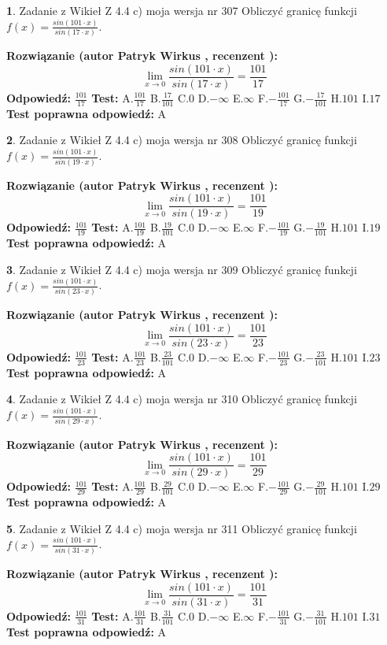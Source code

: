 \documentclass[12pt, a4paper]{article}
\theoremstyle{definition} %
\newtheorem{zad}{}
\newcommand{\zadStart}[1]{\begin{zad}#1\newline}
\newcommand{\zadStop}{\end{zad}}
\newcommand{\rozwStart}[2]{\noindent \textbf{Rozwiązanie (autor #1 , recenzent #2): }\newline}
\newcommand{\rozwStop}{\newline}
\newcommand{\odpStart}{\noindent \textbf{Odpowiedź:}\newline}
\newcommand{\odpStop}{\newline}
\newcommand{\testStart}{\noindent \textbf{Test:}\newline}
\newcommand{\testStop}{\newline}
\newcommand{\kluczStart}{\noindent \textbf{Test poprawna odpowiedź:}\newline}
\newcommand{\kluczStop}{\newline}
\begin{document}
\zadStart{Zadanie z Wikieł Z 4.4 c) moja wersja nr 307}
Obliczyć granicę funkcji $f(x)=\frac{sin(101\cdot x)}{sin(17\cdot x)}$.
\zadStop
\rozwStart{Patryk Wirkus}{}
$$\lim\limits_{x\to 0}\frac{sin(101\cdot x)}{sin(17\cdot x)}=
\frac{101}{17}$$
\rozwStop
\odpStart
$\frac{101}{17}$
\odpStop
\testStart
A.$\frac{101}{17}$
B.$\frac{17}{101}$
C.$0$
D.$-\infty$
E.$\infty$
F.$-\frac{101}{17}$
G.$-\frac{17}{101}$
H.$101$
I.$17$
\testStop
\kluczStart
A
\kluczStop



\zadStart{Zadanie z Wikieł Z 4.4 c) moja wersja nr 308}
Obliczyć granicę funkcji $f(x)=\frac{sin(101\cdot x)}{sin(19\cdot x)}$.
\zadStop
\rozwStart{Patryk Wirkus}{}
$$\lim\limits_{x\to 0}\frac{sin(101\cdot x)}{sin(19\cdot x)}=
\frac{101}{19}$$
\rozwStop
\odpStart
$\frac{101}{19}$
\odpStop
\testStart
A.$\frac{101}{19}$
B.$\frac{19}{101}$
C.$0$
D.$-\infty$
E.$\infty$
F.$-\frac{101}{19}$
G.$-\frac{19}{101}$
H.$101$
I.$19$
\testStop
\kluczStart
A
\kluczStop



\zadStart{Zadanie z Wikieł Z 4.4 c) moja wersja nr 309}
Obliczyć granicę funkcji $f(x)=\frac{sin(101\cdot x)}{sin(23\cdot x)}$.
\zadStop
\rozwStart{Patryk Wirkus}{}
$$\lim\limits_{x\to 0}\frac{sin(101\cdot x)}{sin(23\cdot x)}=
\frac{101}{23}$$
\rozwStop
\odpStart
$\frac{101}{23}$
\odpStop
\testStart
A.$\frac{101}{23}$
B.$\frac{23}{101}$
C.$0$
D.$-\infty$
E.$\infty$
F.$-\frac{101}{23}$
G.$-\frac{23}{101}$
H.$101$
I.$23$
\testStop
\kluczStart
A
\kluczStop



\zadStart{Zadanie z Wikieł Z 4.4 c) moja wersja nr 310}
Obliczyć granicę funkcji $f(x)=\frac{sin(101\cdot x)}{sin(29\cdot x)}$.
\zadStop
\rozwStart{Patryk Wirkus}{}
$$\lim\limits_{x\to 0}\frac{sin(101\cdot x)}{sin(29\cdot x)}=
\frac{101}{29}$$
\rozwStop
\odpStart
$\frac{101}{29}$
\odpStop
\testStart
A.$\frac{101}{29}$
B.$\frac{29}{101}$
C.$0$
D.$-\infty$
E.$\infty$
F.$-\frac{101}{29}$
G.$-\frac{29}{101}$
H.$101$
I.$29$
\testStop
\kluczStart
A
\kluczStop



\zadStart{Zadanie z Wikieł Z 4.4 c) moja wersja nr 311}
Obliczyć granicę funkcji $f(x)=\frac{sin(101\cdot x)}{sin(31\cdot x)}$.
\zadStop
\rozwStart{Patryk Wirkus}{}
$$\lim\limits_{x\to 0}\frac{sin(101\cdot x)}{sin(31\cdot x)}=
\frac{101}{31}$$
\rozwStop
\odpStart
$\frac{101}{31}$
\odpStop
\testStart
A.$\frac{101}{31}$
B.$\frac{31}{101}$
C.$0$
D.$-\infty$
E.$\infty$
F.$-\frac{101}{31}$
G.$-\frac{31}{101}$
H.$101$
I.$31$
\testStop
\kluczStart
A
\kluczStop
\end{document}
